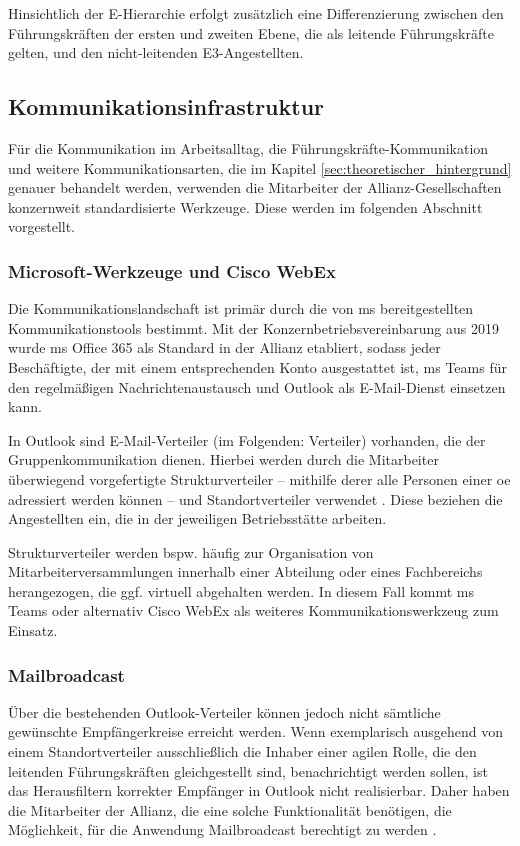 Hinsichtlich der E-Hierarchie erfolgt zusätzlich eine Differenzierung zwischen den Führungskräften der ersten und zweiten Ebene, die als leitende
Führungskräfte gelten, und den nicht-leitenden E3-Angestellten.

\subsection{Kommunikationsinfrastruktur}
\label{subsec:kommunikationsinfrastruktur}
Für die Kommunikation im Arbeitsalltag, die Führungskräfte-Kommunikation und weitere Kommunikationsarten, die im Kapitel \ref{sec:theoretischer_hintergrund}
genauer behandelt werden, verwenden die Mitarbeiter der Allianz-Gesellschaften konzernweit standardisierte Werkzeuge. Diese werden im folgenden
Abschnitt vorgestellt.

\subsubsection{Microsoft-Werkzeuge und Cisco WebEx} %
Die Kommunikationslandschaft ist primär durch die von \gls{ms} bereitgestellten Kommunikationstools bestimmt. Mit der Konzernbetriebsvereinbarung aus
2019 \cite{KBVoffice365} wurde \gls{ms} Office 365 als Standard in der Allianz etabliert, sodass jeder Beschäftigte, der mit einem entsprechenden Konto
ausgestattet ist, \gls{ms} Teams für den regelmäßigen Nachrichtenaustausch und Outlook als E-Mail-Dienst einsetzen kann.

In Outlook sind E-Mail-Verteiler (im Folgenden: Verteiler) vorhanden, die der Gruppenkommunikation dienen. Hierbei werden durch die Mitarbeiter
überwiegend vorgefertigte Strukturverteiler \cite{strukturverteiler} -- mithilfe derer alle Personen einer \gls{oe} adressiert werden können
-- und Standortverteiler verwendet \cite{standortverteiler}. Diese beziehen die Angestellten ein, die in der jeweiligen Betriebsstätte arbeiten.

Strukturverteiler werden bspw. häufig zur Organisation von Mitarbeiterversammlungen innerhalb einer Abteilung oder eines Fachbereichs herangezogen, die
ggf. virtuell abgehalten werden. In diesem Fall kommt \gls{ms} Teams oder alternativ Cisco WebEx als weiteres Kommunikationswerkzeug zum Einsatz.

\subsubsection{Mailbroadcast} %
\label{subsubsec:mbc_allianz}
Über die bestehenden Outlook-Verteiler können jedoch nicht sämtliche gewünschte Empfängerkreise erreicht werden. Wenn exemplarisch ausgehend von einem
Standortverteiler ausschließlich die Inhaber einer agilen Rolle, die den leitenden Führungskräften gleichgestellt sind, benachrichtigt werden sollen,
ist das Herausfiltern korrekter Empfänger in Outlook nicht realisierbar. Daher haben die Mitarbeiter der Allianz, die eine solche Funktionalität benötigen,
die Möglichkeit, für die Anwendung Mailbroadcast berechtigt zu werden \cite{mbc2021,mbc2020}.


